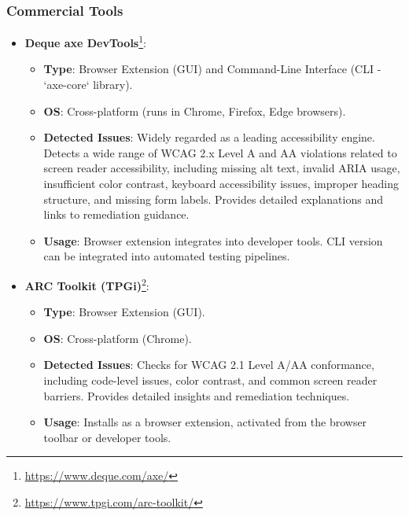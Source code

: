 \subsubsection{Commercial Tools}
\begin{itemize}
    \item \textbf{Deque axe DevTools}\footnote{\url{https://www.deque.com/axe/}}:
        \begin{itemize}
            \item \textbf{Type}: Browser Extension (GUI) and Command-Line Interface (CLI - `axe-core` library).
            \item \textbf{OS}: Cross-platform (runs in Chrome, Firefox, Edge browsers).
            \item \textbf{Detected Issues}: Widely regarded as a leading accessibility engine. Detects a wide range of WCAG 2.x Level A and AA violations related to screen reader accessibility, including missing alt text, invalid ARIA usage, insufficient color contrast, keyboard accessibility issues, improper heading structure, and missing form labels. Provides detailed explanations and links to remediation guidance.
            \item \textbf{Usage}: Browser extension integrates into developer tools. CLI version can be integrated into automated testing pipelines.
        \end{itemize}
    \item \textbf{ARC Toolkit (TPGi)}\footnote{\url{https://www.tpgi.com/arc-toolkit/}}:
        \begin{itemize}
            \item \textbf{Type}: Browser Extension (GUI).
            \item \textbf{OS}: Cross-platform (Chrome).
            \item \textbf{Detected Issues}: Checks for WCAG 2.1 Level A/AA conformance, including code-level issues, color contrast, and common screen reader barriers. Provides detailed insights and remediation techniques.
            \item \textbf{Usage}: Installs as a browser extension, activated from the browser toolbar or developer tools.
        \end{itemize}
\end{itemize}

